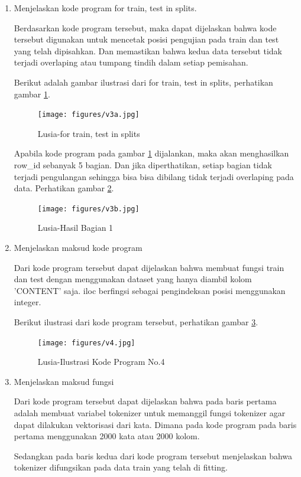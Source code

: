\begin{enumerate}
\item Menjelaskan kode program for train, test in splits.
	
	
	\par Berdasarkan kode program tersebut, maka dapat dijelaskan bahwa kode tersebut digunakan untuk mencetak posisi pengujian pada train dan test yang telah dipisahkan. Dan memastikan bahwa kedua data tersebut tidak terjadi overlaping atau tumpang tindih dalam  setiap pemisahan.
	
	\par Berikut adalah gambar ilustrasi dari for train, test in splits, perhatikan gambar \ref{7A3a}.
	
		\begin{figure}[!hbtp]
		\centering
		\texttt{[image: figures/v3a.jpg]}
		\caption{Lusia-for train, test in splits}
		\label{7A3a}
		\end{figure}
		
	\par Apabila kode program pada gambar \ref{7A3a} dijalankan, maka akan menghasilkan row\_id sebanyak 5 bagian. Dan jika diperthatikan, setiap bagian tidak terjadi pengulangan sehingga bisa bisa dibilang tidak terjadi overlaping pada data. Perhatikan gambar \ref{7A3b}.
		\begin{figure}[!hbtp]
		\centering
		\texttt{[image: figures/v3b.jpg]}
		\caption{Lusia-Hasil Bagian 1}
		\label{7A3b}
		\end{figure}

\item Menjelaskan maksud kode program
	
	\par Dari kode program tersebut dapat dijelaskan bahwa membuat fungsi train dan test dengan menggunakan dataset yang hanya diambil kolom 'CONTENT' saja. iloc berfingsi sebagai pengindeksan posisi menggunakan integer.
	
	\par Berikut ilustrasi dari kode program tersebut, perhatikan gambar \ref{7A4}.
		\begin{figure}[!hbtp]
		\centering
		\texttt{[image: figures/v4.jpg]}
		\caption{Lusia-Ilustrasi Kode Program No.4}
		\label{7A4}
		\end{figure}

\item Menjelaskan maksud fungsi
	
		
	\par Dari kode program tersebut dapat dijelaskan bahwa pada baris pertama adalah membuat variabel tokenizer untuk memanggil fungsi tokenizer agar dapat dilakukan vektorisasi dari kata. Dimana pada kode program pada baris pertama menggunakan 2000 kata atau 2000 kolom.
	\par Sedangkan pada baris kedua dari kode program tersebut menjelaskan bahwa tokenizer difungsikan pada data train yang telah di fitting.
	

\end{enumerate}
